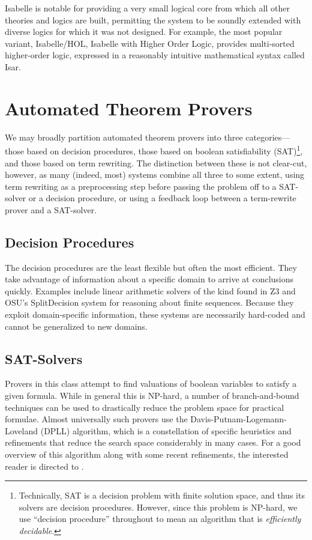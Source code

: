 Isabelle is notable for providing a very small logical core from which all other theories and logics are built, permitting the system to be soundly extended with diverse logics for which it was not designed.  For example, the most popular variant, Isabelle/HOL, Isabelle with Higher Order Logic, provides multi-sorted higher-order logic, expressed in a reasonably intuitive mathematical syntax called Isar\cite{wenzelIsar}.

\section{Automated Theorem Provers}\label{sec:overviewProvers}
We may broadly partition automated theorem provers into three categories---those based on decision procedures, those based on boolean satisfiability (SAT)\footnote{Technically, SAT is a decision problem with finite solution space, and thus its solvers are decision procedures.  However, since this problem is NP-hard, we use ``decision procedure'' throughout to mean an algorithm that is \emph{efficiently decidable}.}, and those based on term rewriting.  The distinction between these is not clear-cut, however, as many (indeed, most) systems combine all three to some extent, using term rewriting as a preprocessing step before passing the problem off to a SAT-solver or a decision procedure, or using a feedback loop between a term-rewrite prover and a SAT-solver.

\subsection{Decision Procedures} The decision procedures are the least flexible but often the most efficient.  They take advantage of information about a specific domain to arrive at conclusions quickly.  Examples include linear arithmetic solvers of the kind found in Z3\cite{deMouraZ3} and OSU's SplitDecision\cite{Sit11} system for reasoning about finite sequences.  Because they exploit domain-specific information, these systems are necessarily hard-coded and cannot be generalized to new domains.

\subsection{SAT-Solvers} Provers in this class attempt to find valuations of boolean variables to satisfy a given formula.  While in general this is NP-hard, a number of branch-and-bound techniques can be used to drastically reduce the problem space for practical formulae.  Almost universally such provers use the Davis-Putnam-Logemann-Loveland (DPLL) algorithm, which is a constellation of specific heuristics and refinements that reduce the search space considerably in many cases.  For a good overview of this algorithm along with some recent refinements, the interested reader is directed to \cite{nieuwenhuisDPLL}.

